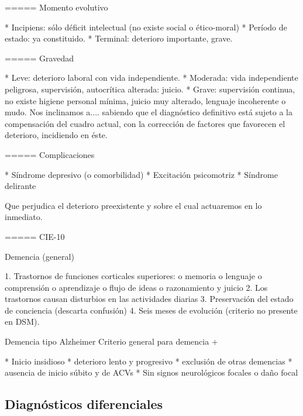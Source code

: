 ===== Momento evolutivo

* Incipiens: sólo déficit intelectual (no existe social o ético-moral)
* Período de estado: ya constituido.
* Terminal: deterioro importante, grave.

===== Gravedad

* Leve: deterioro laboral con vida independiente.
* Moderada: vida independiente peligrosa, supervisión, autocrítica alterada: juicio.
* Grave: supervisión continua, no existe higiene personal mínima, juicio muy alterado, lenguaje incoherente o mudo. Nos inclinamos a.... sabiendo que el diagnóstico definitivo está sujeto a la compensación del cuadro actual, con la corrección de factores que favorecen el deterioro, incidiendo en éste.

===== Complicaciones

* Síndrome depresivo (o comorbilidad)
* Excitación psicomotriz
* Síndrome delirante

Que perjudica el deterioro preexistente y sobre el cual actuaremos en lo inmediato.

===== CIE-10

Demencia (general)

1. Trastornos de funciones corticales superiores: o memoria o lenguaje o comprensión o aprendizaje o flujo de ideas o razonamiento y juicio
2. Los trastornos causan disturbios en las actividades diarias
3. Preservación del estado de conciencia (descarta confusión)
4. Seis meses de evolución (criterio no presente en DSM).

Demencia tipo Alzheimer Criterio general para demencia +

* Inicio insidioso
* deterioro lento y progresivo
* exclusión de otras demencias
* ausencia de inicio súbito y de ACVs
* Sin signos neurológicos focales o daño focal

\subsection*{Diagnósticos diferenciales}

